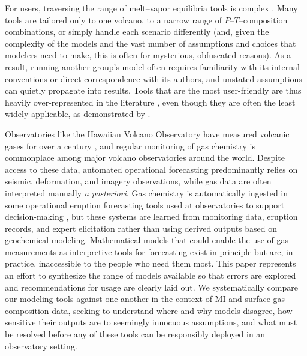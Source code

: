 \documentclass[draft, english]{volcanica-template}
\begin{document}
For users, traversing the range of melt–vapor equilibria tools is complex \parencite{papale2022thermodynamics}. Many tools are tailored only to one volcano, to a narrow range of $P$–$T$–composition combinations, or simply handle each scenario differently (and, given the complexity of the models and the vast number of assumptions and choices that modelers need to make, this is often for mysterious, obfuscated reasons). As a result, running another group's model often requires familiarity with its internal conventions or direct correspondence with its authors, and unstated assumptions can quietly propagate into results. Tools that are the most user-friendly are thus heavily over-represented in the literature \parencite[e.g., VolatileCalc;][]{Newman2002}, even though they are often the least widely applicable, as demonstrated by \textcite{WieserVESIcal2022}. 

Observatories like the Hawaiian Volcano Observatory have measured volcanic gases for over a century \parencite{sutton2014}, and regular monitoring of gas chemistry is commonplace among major volcano observatories around the world. Despite access to these data, automated operational forecasting predominantly relies on seismic, deformation, and imagery observations, while gas data are often interpreted manually \textit{a posteriori}. Gas chemistry is automatically ingested in some operational eruption forecasting tools used at observatories to support decision-making \parencite[e.g., in Aotearoa New Zealand for Ruapehu and Whakaari;][]{christophersen2022,behr2025}, but these systems are learned from monitoring data, eruption records, and expert elicitation rather than using derived outputs based on geochemical modeling. Mathematical models that could enable the use of gas measurements as interpretive tools for forecasting exist in principle but are, in practice, inaccessible to the people who need them most. This paper represents an effort to synthesize the range of models available so that errors are explored and recommendations for usage are clearly laid out. We systematically compare our modeling tools against one another in the context of MI and surface gas composition data, seeking to understand where and why models disagree, how sensitive their outputs are to seemingly innocuous assumptions, and what must be resolved before any of these tools can be responsibly deployed in an observatory setting.
\end{document}
